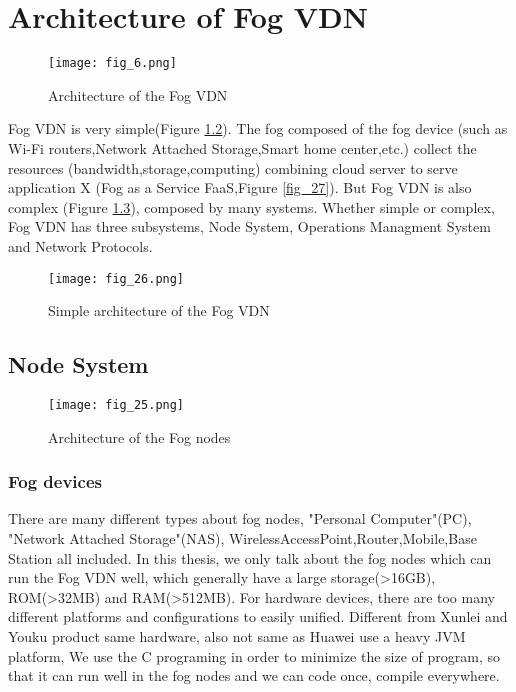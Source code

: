 \chapter{Architecture of Fog VDN}
\label{chap:chap-three}
\begin{figure}[htbp]
\centering
	  \texttt{[image: fig\_6.png]}
    \caption{Architecture of the Fog VDN}
	  \vskip 1.0cm
 \label{fig_6}
\end{figure}



Fog VDN is very simple(Figure \ref{fig_26}). The fog composed of the fog device
(such as Wi-Fi routers,Network Attached Storage,Smart home center,etc.) collect the
resources (bandwidth,storage,computing) combining cloud server to serve application X
(Fog as a Service FaaS,Figure \ref{fig_27}). But Fog VDN is also complex (Figure \ref{fig_6}),
composed by many systems. Whether simple or complex, Fog VDN has three subsystems,
Node System, Operations Managment System and Network Protocols.

\begin{figure}[htbp]
\centering
	  \texttt{[image: fig\_26.png]}
    \caption{Simple architecture of the Fog VDN}
 \label{fig_26}
\end{figure}

\section{Node System}

\begin{figure}[htbp]
\centering
	  \texttt{[image: fig\_25.png]}
    \caption{ Architecture of the Fog nodes}
 \label{fig_6}
\end{figure}

  \subsection{Fog devices}
    \label{Fog devices}
  There are many different types about fog nodes, "Personal Computer"(PC), "Network Attached Storage"(NAS),
WirelessAccessPoint,Router,Mobile,Base Station all included. In this thesis, we only talk about the fog nodes
which can run the Fog VDN well, which generally have a large storage(>16GB), ROM(>32MB) and RAM(>512MB).
  For hardware devices, there are too many different platforms and configurations to easily unified.
Different from Xunlei and Youku product same hardware, also not same as Huawei use a heavy JVM platform,
 We use the C programing in order to minimize the size of program, so that it can run well in the fog
nodes and we can code once, compile everywhere.
